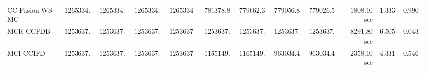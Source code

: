 \begin{table}[H]
\begin{tabular}{lrrrrrrrrrrr}
     CC-Fusion-WS-MC & $   1265334.24$ & $   1265334.24$ & $   1265334.24$ & $   1265334.24$ & $    781378.89$ & $    779662.36$ & $    779056.84$ & $    779026.51$ & $      1808.10$ sec    & $       1.3334$  & $       0.9906$ \\ 
\cmidrule{1-1} 
           MCR-CCFDB & $   1253637.12$ & $   1253637.12$ & $   1253637.12$ & $   1253637.12$ & $   1253637.12$ & $   1253637.12$ & $   1253637.12$ & $   1253637.12$ & $      8291.80$ sec    & $       6.5058$  & $       0.0432$ \\ 
\cmidrule{1-1} 
           MCI-CCIFD & $   1253637.12$ & $   1253637.12$ & $   1253637.12$ & $   1253637.12$ & $   1165149.49$ & $   1165149.49$ & $    963034.43$ & $    963034.43$ & $      2358.10$ sec    & $       4.3319$  & $       0.5461$ \\ 
\bottomrule
\end{tabular}
\end{table}